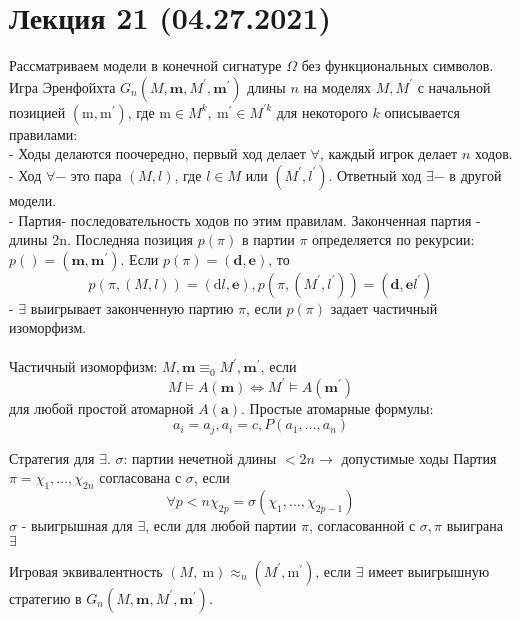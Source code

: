 \section{Лекция 21 (04.27.2021)}

Рассматриваем модели в конечной сигнатуре $\Omega$ без функциональных символов. Игра Эренфойхта $G_{n}\left(M, \mathbf{m}, M^{\prime}, \mathbf{m}^{\prime}\right)$ длины $n$ на моделях $M, M^{\prime}$ с начальной позицией $\left(\mathrm{m}, \mathrm{m}^{\prime}\right)$, где $\mathrm{m} \in M^{k}, \mathrm{~m}^{\prime} \in M^{\prime k}$ для
некоторого $k$ описывается правилами:\\
- Ходы делаются поочередно, первый ход делает $\forall$, каждый игрок делает $n$ ходов.\\
- Ход $\forall-$ это пара $(M, l)$, где $l \in M$ или $\left(M^{\prime}, l^{\prime}\right).$ Ответный ход $\exists-$ в другой модели.\\
- Партия- последовательность ходов по этим правилам. Законченная партия - длины 2n. Последняа позиция $p(\pi)$ в партии $\pi$ определяется по рекурсии:\\
$p()=\left(\mathbf{m}, \mathbf{m}^{\prime}\right).$ Если $p(\pi)=(\mathbf{d}, \mathbf{e})$, то
$$
p(\pi,(M, l))=(\mathrm{d} l, \mathbf{e}), p\left(\pi,\left(M^{\prime}, l^{\prime}\right)\right)=\left(\mathbf{d}, \mathbf{e} l^{\prime}\right)
$$
- $\exists$ выигрывает законченную партию $\pi$, если $p(\pi)$ задает частичный изоморфизм.\\
\\
Частичный изоморфизм:
$M, \mathbf{m} \equiv_{0} M^{\prime}, \mathbf{m}^{\prime}$, если
$$
M \vDash A(\mathbf{m}) \Leftrightarrow M^{\prime} \vDash A\left(\mathbf{m}^{\prime}\right)
$$
для любой простой атомарной $A(\mathbf{a}).$ Простые атомарные формулы:
$$
a_{i}=a_{j}, a_{i}=c, P\left(a_{1}, \ldots, a_{n}\right)
$$
\begin{defn}
Стратегия для $\exists$.
$\sigma$: партии нечетной длины $<2 n \longrightarrow$ допустимые ходы
Партия $\pi=\chi_{1}, \ldots, \chi_{2 n}$ согласована с $\sigma$, если
$$
\forall p<n \chi_{2 p}=\sigma\left(\chi_{1}, \ldots, \chi_{2 p-1}\right)
$$
$\sigma$ - выигрышная для $\exists$, если для любой партии $\pi$, согласованной с $\sigma, \pi$ выиграна $\exists$
\end{defn}
\begin{defn}
Игровая эквивалентность $(M, \mathrm{~m}) \approx_{n}\left(M^{\prime}, \mathrm{m}^{\prime}\right)$, если
$\exists$ имеет выигрышную стратегию в $G_{n}\left(M, \mathbf{m}, M^{\prime}, \mathbf{m}^{\prime}\right).$
\end{defn}
